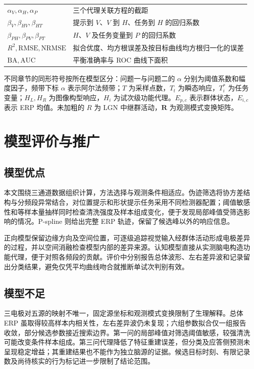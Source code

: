 \begin{longtable}{@{}>{\raggedright\arraybackslash}p{}>{\raggedright\arraybackslash}p{}@{}}
\(\alpha_V,\alpha_H,\alpha_P\) & 三个代理关联方程的截距 \\
\(\beta_V,\beta_{HV},\beta_{HT}\) & 提示到 \(V\)、\(V\) 到 \(H\)、任务到 \(H\) 的回归系数 \\
\(\beta_{PH},\beta_{PV},\beta_{PT}\) & \(H\)、\(V\) 及任务变量到 \(P\) 的回归系数 \\
\(R^2,\mathrm{RMSE},\mathrm{NRMSE}\) & 拟合优度、均方根误差及按目标曲线均方根归一化的误差 \\
\(\mathrm{BA},\mathrm{AUC}\) & 平衡准确率与 ROC 曲线下面积 \\
\end{longtable}
\endgroup

不同章节的同形符号按所在模型区分：问题一与问题二的 \(\alpha\) 分别为阈值系数和幅度因子，频带下标 \(\alpha\) 表示阿尔法频带；\(T\) 为采样点数，\(T_t\) 为瞬态响应，\(T_i^*\) 为任务变量；\(H_L,H_R\) 为图像构型响应，\(H_i\) 为试次级功能代理。\(E_{p,c}\) 表示群体状态，\(E_{i,c}\) 表示 ERP 均值。未加粗的 \(R\) 为 LGN 中继群活动，\(\mathbf R\) 为观测模式变换矩阵。


\section{模型评价与推广}

\subsection{模型优点}

本文围绕三通道数据组织计算，方法选择与观测条件相适应。伪迹筛选将协方差结构与分频段异常结合，对位置提示和形状提示任务采用不同检测器配置；阈值敏感性和等样本量抽样同时检查清洗强度及样本组成变化，便于发现局部峰值受筛选影响的情况。P-spline 则给出完整 ERP 轨迹，保留了候选峰以外的响应信息。

正向模型保留边缘方向及空间位置，可逐级追踪视觉输入经群体活动形成电极差异的过程，并以空间消融检查模型内部的差异来源。认知模型直接从实测脑电构造功能代理，便于对照各频段的贡献。评价中分别报告总体波形、左右差异波和记录留出分类结果，避免仅凭平均曲线吻合就推断单试次判别有效。

\subsection{模型不足}

三电极对五源的映射不唯一，固定源坐标和观测模式变换限制了生理解释。总体 ERP 虽取得较高样本内相关性，左右差异波仍未复现；六组参数拟合仅一组报告收敛，部分候选参数接近搜索边界。第一问的局部峰值对筛选阈值敏感，较强清洗可能改变条件样本组成。第三问代理降低了特征重建误差，但分类及应答侧预测未呈现稳定增益；其重建结果也不能作为独立脑源的证据。候选目标时刻、有限记录数及尚待核实的行为标记进一步限制了结论范围。


